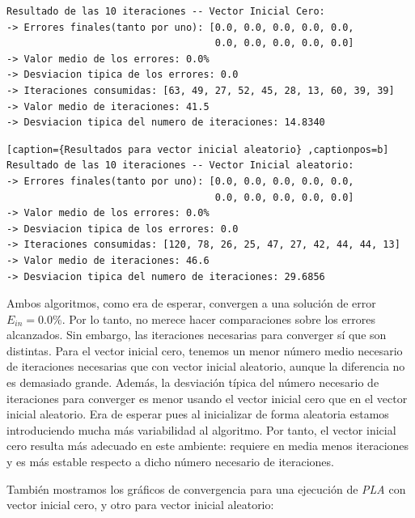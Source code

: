 \documentclass[11pt]{article}
\begin{document}
\begin{lstlisting}[caption={Resultados para vector inicial cero}, captionpos=b]
Resultado de las 10 iteraciones -- Vector Inicial Cero:
-> Errores finales(tanto por uno): [0.0, 0.0, 0.0, 0.0, 0.0,
                                    0.0, 0.0, 0.0, 0.0, 0.0]
-> Valor medio de los errores: 0.0%
-> Desviacion tipica de los errores: 0.0
-> Iteraciones consumidas: [63, 49, 27, 52, 45, 28, 13, 60, 39, 39]
-> Valor medio de iteraciones: 41.5
-> Desviacion tipica del numero de iteraciones: 14.8340
\end{lstlisting}

\begin{lstlisting}[caption={Resultados para vector inicial aleatorio} ,captionpos=b]
Resultado de las 10 iteraciones -- Vector Inicial aleatorio:
-> Errores finales(tanto por uno): [0.0, 0.0, 0.0, 0.0, 0.0,
                                    0.0, 0.0, 0.0, 0.0, 0.0]
-> Valor medio de los errores: 0.0%
-> Desviacion tipica de los errores: 0.0
-> Iteraciones consumidas: [120, 78, 26, 25, 47, 27, 42, 44, 44, 13]
-> Valor medio de iteraciones: 46.6
-> Desviacion tipica del numero de iteraciones: 29.6856
\end{lstlisting}

Ambos algoritmos, como era de esperar, convergen a una solución de error $E_{in} = 0.0\%$. Por lo tanto, no merece hacer comparaciones sobre los errores alcanzados. Sin embargo, las iteraciones necesarias para converger sí que son distintas. Para el vector inicial cero, tenemos un menor número medio necesario de iteraciones necesarias que con vector inicial aleatorio, aunque la diferencia no es demasiado grande. Además, la desviación típica del número necesario de iteraciones para converger es menor usando el vector inicial cero que en el vector inicial aleatorio. Era de esperar pues al inicializar de forma aleatoria estamos introduciendo mucha más variabilidad al algoritmo. Por tanto, el vector inicial cero resulta más adecuado en este ambiente: requiere en media menos iteraciones y es más estable respecto a dicho número necesario de iteraciones.

También mostramos los gráficos de convergencia para una ejecución de \emph{PLA} con vector inicial cero, y otro para vector inicial aleatorio:
\end{document}
